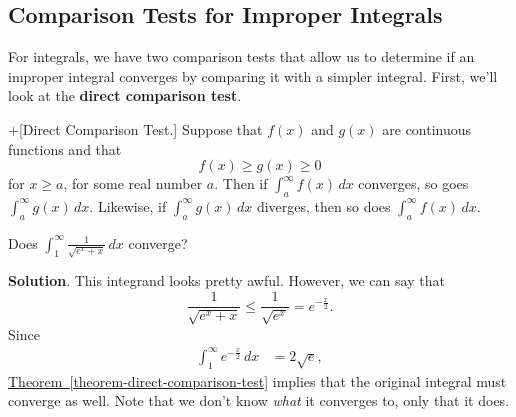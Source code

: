 \documentclass[10pt,]{book}
\newcommand{\terminology}[1]{\textbf{#1}}
\theoremstyle{ptxplainnotitle}
\theoremstyle{ptxplaintitle}
\theoremstyle{ptxplainnotitle}
\theoremstyle{ptxplaintitle}
\theoremstyle{ptxplainnotitle}
\theoremstyle{ptxplaintitle}
\theoremstyle{ptxdefinitionnotitle}
\theoremstyle{ptxdefinitiontitle}
\theoremstyle{ptxdefinitionnotitle}
\theoremstyle{ptxdefinitiontitle}
\theoremstyle{ptxdefinitionnotitle}
\theoremstyle{ptxdefinitiontitle}
\theoremstyle{ptxdefinitionnotitle}
\theoremstyle{ptxdefinitiontitle}
\theoremstyle{ptxdefinitionnotitle}
\theoremstyle{ptxdefinitiontitle}
\numberwithin{equation}{section}
\begin{document}
\subsection[{Comparison Tests for Improper Integrals}]{Comparison Tests for Improper Integrals}\label{subsection-comparison-tests-for-improper-integrals}
\hypertarget{p-602}{}%
For integrals, we have two comparison tests that allow us to determine if an improper integral converges by comparing it with a simpler integral. First, we'll look at the \terminology{direct comparison test}.%
\begin{theorem}+[{Direct Comparison Test.}]\label{theorem-direct-comparison-test}
\hypertarget{p-603}{}%
Suppose that \(f(x)\) and \(g(x)\) are continuous functions and that%
\begin{equation*}
f(x) \geq g(x) \geq 0
\end{equation*}
for \(x\geq a\), for some real number \(a\). Then if \(\int_{a}^{\infty}f(x)\,dx\) converges, so goes \(\int_{a}^{\infty}g(x)\,dx\). Likewise, if \(\int_{a}^{\infty}g(x)\,dx\) diverges, then so does \(\int_{a}^{\infty}f(x)\,dx\).%
\end{theorem}
\begin{example}\label{example-135}
\hypertarget{p-604}{}%
Does \(\int_{1}^{\infty}\frac{1}{\sqrt{e^{x} + x}}\,dx\) converge?%
\par\smallskip%
\noindent\textbf{Solution}.\hypertarget{solution-131}{}\quad%
\hypertarget{p-605}{}%
This integrand looks pretty awful. However, we can say that%
\begin{equation*}
\frac{1}{\sqrt{e^{x} + x}} \leq \frac{1}{\sqrt{e^{x}}} = e^{-\frac{x}{2}}.
\end{equation*}
Since%
\begin{align*}
\int_{1}^{\infty}e^{-\frac{x}{2}}\,dx & = 2\sqrt{e}, 
\end{align*}
\hyperref[theorem-direct-comparison-test]{Theorem~\ref{theorem-direct-comparison-test}} implies that the original integral must converge as well. Note that we don't know \emph{what} it converges to, only that it does.%
\end{example}
\end{document}
